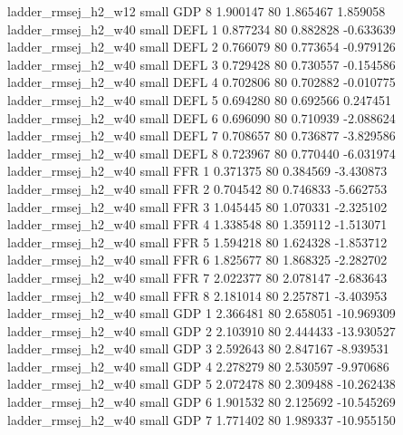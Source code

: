      ladder_rmsej_h2_w12      small      GDP                 8 1.900147 80       1.865467           1.859058
     ladder_rmsej_h2_w40      small     DEFL                 1 0.877234 80       0.882828          -0.633639
     ladder_rmsej_h2_w40      small     DEFL                 2 0.766079 80       0.773654          -0.979126
     ladder_rmsej_h2_w40      small     DEFL                 3 0.729428 80       0.730557          -0.154586
     ladder_rmsej_h2_w40      small     DEFL                 4 0.702806 80       0.702882          -0.010775
     ladder_rmsej_h2_w40      small     DEFL                 5 0.694280 80       0.692566           0.247451
     ladder_rmsej_h2_w40      small     DEFL                 6 0.696090 80       0.710939          -2.088624
     ladder_rmsej_h2_w40      small     DEFL                 7 0.708657 80       0.736877          -3.829586
     ladder_rmsej_h2_w40      small     DEFL                 8 0.723967 80       0.770440          -6.031974
     ladder_rmsej_h2_w40      small      FFR                 1 0.371375 80       0.384569          -3.430873
     ladder_rmsej_h2_w40      small      FFR                 2 0.704542 80       0.746833          -5.662753
     ladder_rmsej_h2_w40      small      FFR                 3 1.045445 80       1.070331          -2.325102
     ladder_rmsej_h2_w40      small      FFR                 4 1.338548 80       1.359112          -1.513071
     ladder_rmsej_h2_w40      small      FFR                 5 1.594218 80       1.624328          -1.853712
     ladder_rmsej_h2_w40      small      FFR                 6 1.825677 80       1.868325          -2.282702
     ladder_rmsej_h2_w40      small      FFR                 7 2.022377 80       2.078147          -2.683643
     ladder_rmsej_h2_w40      small      FFR                 8 2.181014 80       2.257871          -3.403953
     ladder_rmsej_h2_w40      small      GDP                 1 2.366481 80       2.658051         -10.969309
     ladder_rmsej_h2_w40      small      GDP                 2 2.103910 80       2.444433         -13.930527
     ladder_rmsej_h2_w40      small      GDP                 3 2.592643 80       2.847167          -8.939531
     ladder_rmsej_h2_w40      small      GDP                 4 2.278279 80       2.530597          -9.970686
     ladder_rmsej_h2_w40      small      GDP                 5 2.072478 80       2.309488         -10.262438
     ladder_rmsej_h2_w40      small      GDP                 6 1.901532 80       2.125692         -10.545269
     ladder_rmsej_h2_w40      small      GDP                 7 1.771402 80       1.989337         -10.955150
